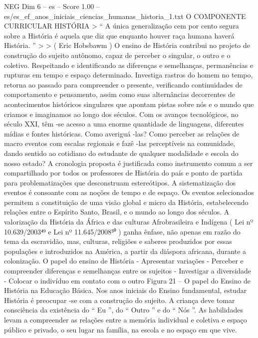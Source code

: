 \begin{textsample}{NEG Dim 6 – es – Score 1.00 – es/es\_ef\_anos\_iniciais\_ciencias\_humanas\_historia\_1.txt}  \label{ex:f6_neg_142}
O COMPONENTE CURRICULAR HISTÓRIA > “ A única generalização cem por cento segura sobre a História é aquela que diz que enquanto houver raça humana haverá História. ” > > ( Eric Hobsbawm ) O ensino de História contribui no projeto de construção do sujeito autônomo, capaz de perceber o singular, o outro e o coletivo.
Respeitando e identificando as diferenças e semelhanças, permanências e rupturas em tempo e espaço determinado.
Investiga rastros do homem no tempo, retorna ao passado para compreender o presente, verificando continuidades de comportamento e pensamento, assim como suas alternâncias decorrentes de acontecimentos históricos singulares que apontam pistas sobre nós e o mundo que criamos e imaginamos ao longo dos séculos.
Com os avanços tecnológicos, no século XXI, têm -se acesso a uma enorme quantidade de linguagens, diferentes mídias e fontes históricas.
Como averiguá -las?
Como perceber as relações de macro eventos com escalas regionais e fazê -las perceptíveis na comunidade, dando sentido ao cotidiano do estudante de qualquer modalidade e escola do nosso estado?
A cronologia proposta é justificada como instrumento comum a ser compartilhado por todos os professores de História do país e ponto de partida para problematizações que desconstruam estereótipos.
A sistematização dos eventos é consoante com as noções de tempo e de espaço.
Os eventos selecionados permitem a constituição de uma visão global e micro da História, estabelecendo relações entre o Espírito Santo, Brasil, e o mundo ao longo dos séculos.
A valorização da História da África e das culturas Afrobrasileira e Indígena ( Lei nº 10.639/2003⁴⁹ e Lei nº 11.645/2008⁵⁰ ) ganha ênfase, não apenas em razão do tema da escravidão, mas, culturas, religiões e saberes produzidos por essas populações e introduzidos na América, a partir da diáspora africana, durante a colonização.
O papel do ensino de História - Apresentar variações - Perceber e compreender diferenças e semelhanças entre os sujeitos - Investigar a diversidade - Colocar o indivíduo em contato com o outro Figura 21 – O papel do Ensino de História na Educação Básica.
Nos anos iniciais do Ensino fundamental, estudar História é preocupar -se com a construção do sujeito.
A criança deve tomar consciência da existência do “ Eu ”, do “ Outro ” e do “ Nós ”.
As habilidades levam a compreender as relações entre a memória individual e coletiva e espaço público e privado, o seu lugar na família, na escola e no espaço em que vive.

\end{textsample}
